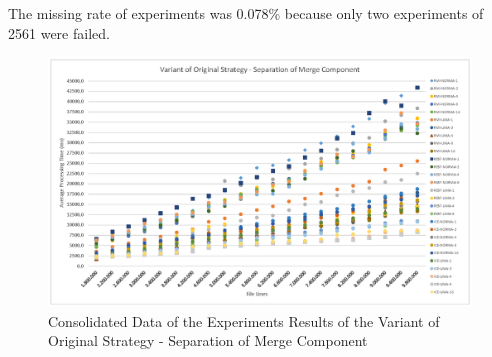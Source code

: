 The missing rate of experiments was 0.078\% because only two experiments of 2561 were failed.

\begin{landscape}
	
\begin{figure}
	\includegraphics[trim=1cm 8cm -1cm 8cm, scale=1.3]{fig/variantOriginalStrategyGraph.eps}
	\caption{Consolidated Data of the Experiments Results of the Variant of Original Strategy - Separation of Merge Component}
	\label{fig:variantOriginalStrategyConsolidated}
\end{figure}


\end{landscape}
